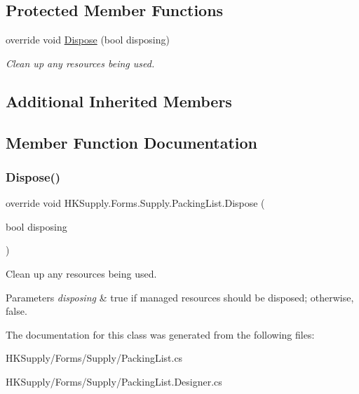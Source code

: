\subsection*{Protected Member Functions}
\begin{DoxyCompactItemize}
\item 
override void \mbox{\hyperlink{class_h_k_supply_1_1_forms_1_1_supply_1_1_packing_list_ac3e5f6d9e9d27b8d1695e58dae35abef}{Dispose}} (bool disposing)
\begin{DoxyCompactList}\small\item\em Clean up any resources being used. \end{DoxyCompactList}\end{DoxyCompactItemize}
\subsection*{Additional Inherited Members}


\subsection{Member Function Documentation}
\mbox{\label{class_h_k_supply_1_1_forms_1_1_supply_1_1_packing_list_ac3e5f6d9e9d27b8d1695e58dae35abef}} 
\subsubsection{\texorpdfstring{Dispose()}{Dispose()}}
{\footnotesize\ttfamily override void H\+K\+Supply.\+Forms.\+Supply.\+Packing\+List.\+Dispose (\begin{DoxyParamCaption}\item[{bool}]{disposing }\end{DoxyParamCaption})\hspace{0.3cm}{\ttfamily [protected]}}



Clean up any resources being used. 


\begin{DoxyParams}{Parameters}
{\em disposing} & true if managed resources should be disposed; otherwise, false.\\
\hline
\end{DoxyParams}


The documentation for this class was generated from the following files\+:\begin{DoxyCompactItemize}
\item 
H\+K\+Supply/\+Forms/\+Supply/Packing\+List.\+cs\item 
H\+K\+Supply/\+Forms/\+Supply/Packing\+List.\+Designer.\+cs\end{DoxyCompactItemize}
